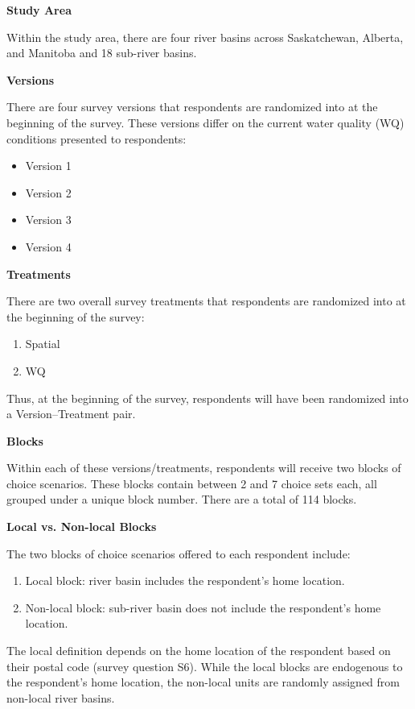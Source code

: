 \documentclass[12pt]{article}
\begin{document}
\textbf{Study Area}

Within the study area, there are four river basins across Saskatchewan, Alberta, and Manitoba and 18 sub-river basins.

\noindent\textbf{Versions}


There are four survey versions that respondents are randomized into at the beginning of the survey. These versions differ 
on the current water quality (WQ) conditions presented to respondents:
\begin{itemize}
    \item Version 1
    \item Version 2
    \item Version 3
    \item Version 4
\end{itemize}    


\noindent\textbf{Treatments}

There are two overall survey treatments that respondents are randomized into at the beginning of the survey:
\begin{enumerate}
    \item Spatial
    \item WQ
\end{enumerate}


Thus, at the beginning of the survey, respondents will have been randomized into a Version--Treatment pair.

\noindent\textbf{Blocks}

Within each of these versions/treatments, respondents will receive two blocks of choice scenarios. These blocks contain between 2 
and 7 choice sets each, all grouped under a unique block number. There are a total of 114 blocks.

\noindent\textbf{Local vs. Non-local Blocks}

The two blocks of choice scenarios offered to each respondent include:
\begin{enumerate}
    \item Local block: river basin includes the respondent’s home location.
    \item Non-local block: sub-river basin does not include the respondent’s home location.
\end{enumerate}


The local definition depends on the home location of the respondent based on their postal code (survey question S6). While the local 
blocks are endogenous to the respondent’s home location, the non-local units are randomly assigned from non-local river basins.
\end{document}
